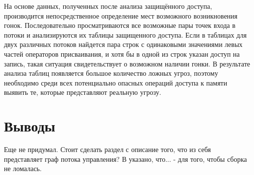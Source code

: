 На основе данных, полученных после анализа защищённого доступа, производится непосредственное определение мест возможного возникновения гонок. Последовательно просматриваются все возможные пары точек входа в потоки и анализируются их таблицы защищенного доступа. Если в таблицах для двух различных потоков найдется пара строк с одинаковыми значениями левых частей операторов присваивания, и хотя бы в одной из строк указан доступ на запись, такая ситуация свидетельствует о возможном наличии гонки. В результате анализа таблиц появляется большое количество ложных угроз, поэтому необходимо среди всех потенциально опасных операций доступа к памяти выявить те, которые представляют реальную угрозу.



\section{Выводы}

Еще не придумал.
Стоит сделать раздел с описание того, что из себя представляет граф потока управления?
В \cite{Pup09} указано, что...  - для того, чтобы сборка не ломалась. 
